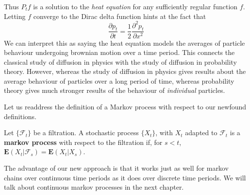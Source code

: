 %
Thus $P_tf$ is a solution to the {\it heat equation} for any sufficiently regular function $f$. Letting $f$ converge to the Dirac delta function hints at the fact that
%
\[ \frac{\partial p_t}{\partial t} = \frac{1}{2} \frac{\partial^2 p_t}{\partial x^2} \]
%
We can interpret this as saying the heat equation models the averages of particle behaviour undergoing brownian motion over a time period. This connects the classical study of diffusion in physics with the study of diffusion in probability theory. However, whereas the study of diffusion in physics gives results about the average behaviour of particles over a long period of time, whereas probability theory gives much stronger results of the behaviour of {\it individual} particles.




Let us readdress the definition of a Markov process with respect to our newfound definitions.

\begin{definition}
    Let $\{ \mathcal{F}_t \}$ be a filtration. A stochastic process $\{ X_t \}$, with $X_t$ adapted to $\mathcal{F}_t$ is a {\bf markov process} with respect to the filtration if, for $s < t$, $\mathbf{E}(X_t | \mathcal{F}_s) = \mathbf{E}(X_t | X_s)$.
\end{definition}

The advantage of our new approach is that it works just as well for markov chains over continuous time periods as it does over discrete time periods. We will talk about continuous markov processes in the next chapter.